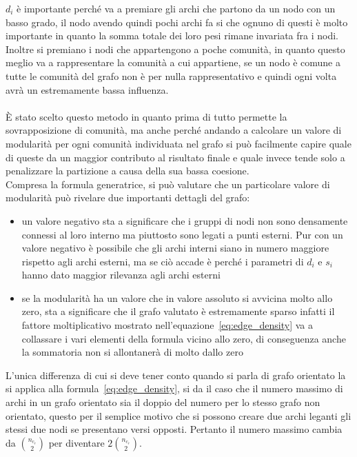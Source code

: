 $d_i$ è importante perché va a premiare gli archi che partono da un nodo con un basso grado, il nodo avendo quindi pochi archi fa si che ognuno di questi è molto importante in quanto la somma totale dei loro pesi rimane invariata fra i nodi. Inoltre si premiano i nodi che appartengono a poche comunità, in quanto questo meglio va a rappresentare la comunità a cui appartiene, se un nodo è comune a tutte le comunità del grafo non è per nulla rappresentativo e quindi ogni volta avrà un estremamente bassa influenza.\\
\\
È stato scelto questo metodo in quanto prima di tutto permette la sovrapposizione di comunità, ma anche perché andando a calcolare un valore di modularità per ogni comunità individuata nel grafo si può facilmente capire quale di queste da un maggior contributo al risultato finale e quale invece tende solo a penalizzare la partizione a causa della sua bassa coesione.\\
Compresa la formula generatrice, si può valutare che un particolare valore di modularità può rivelare  due importanti dettagli del grafo:
\begin{itemize}
	\item un valore negativo sta a significare che i gruppi di nodi non sono densamente connessi al loro interno ma piuttosto sono legati a punti esterni. Pur con un valore negativo è possibile che gli archi interni siano in numero maggiore rispetto agli archi esterni, ma se ciò accade è perché i parametri di $d_i$ e $s_i$ hanno dato maggior rilevanza agli archi esterni
	\item se la modularità ha un valore che in valore assoluto si avvicina molto allo zero, sta a significare che il grafo valutato è estremamente sparso infatti il fattore moltiplicativo mostrato nell'equazione~\ref{eq:edge_density} va a collassare i vari elementi della formula vicino allo zero, di conseguenza anche la sommatoria non si allontanerà di molto dallo zero
\end{itemize}
L'unica differenza di cui si deve tener conto quando si parla di grafo orientato la si applica alla formula~\ref{eq:edge_density}, si da il caso che il numero massimo di archi in un grafo orientato sia il doppio del numero per lo stesso grafo non orientato, questo per il semplice motivo che si possono creare due archi leganti gli stessi due nodi se presentano versi opposti. Pertanto il numero massimo cambia da $ \displaystyle\binom{n_{c_r}}{2}$ per diventare $\displaystyle 2\binom{n_{c_r}}{2}$.
%
%
